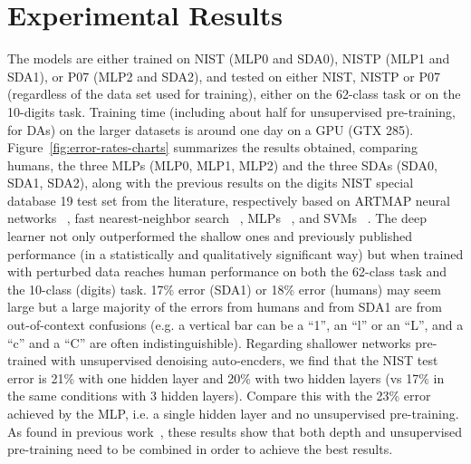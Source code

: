 \documentclass{article} %
\begin{document}
\vspace*{-2mm}
\section{Experimental Results}
\vspace*{-2mm}

The models are either trained on NIST (MLP0 and SDA0), 
NISTP (MLP1 and SDA1), or P07 (MLP2 and SDA2), and tested
on either NIST, NISTP or P07 (regardless of the data set used for training),
either on the 62-class task
or on the 10-digits task. Training time (including about half
for unsupervised pre-training, for DAs) on the larger
datasets is around one day on a GPU (GTX 285).
Figure~\ref{fig:error-rates-charts} summarizes the results obtained,
comparing humans, the three MLPs (MLP0, MLP1, MLP2) and the three SDAs (SDA0, SDA1,
SDA2), along with the previous results on the digits NIST special database
19 test set from the literature, respectively based on ARTMAP neural
networks ~\citep{Granger+al-2007}, fast nearest-neighbor search
~\citep{Cortes+al-2000}, MLPs ~\citep{Oliveira+al-2002-short}, and SVMs
~\citep{Milgram+al-2005}.%
The deep learner not only outperformed the shallow ones and
previously published performance (in a statistically and qualitatively
significant way) but when trained with perturbed data
reaches human performance on both the 62-class task
and the 10-class (digits) task. 
17\% error (SDA1) or 18\% error (humans) may seem large but a large
majority of the errors from humans and from SDA1 are from out-of-context
confusions (e.g. a vertical bar can be a ``1'', an ``l'' or an ``L'', and a
``c'' and a ``C'' are often indistinguishible).
Regarding shallower networks pre-trained with unsupervised denoising
auto-encders, we find that the NIST test error is 21\% with one hidden
layer and 20\% with two hidden layers (vs 17\% in the same conditions
with 3 hidden layers). Compare this with the 23\% error achieved
by the MLP, i.e. a single hidden layer and no unsupervised pre-training.
As found in previous work~\cite{Erhan+al-2010,Larochelle-jmlr-2009}, 
these results show that both depth and
unsupervised pre-training need to be combined in order to achieve
the best results.
\end{document}
